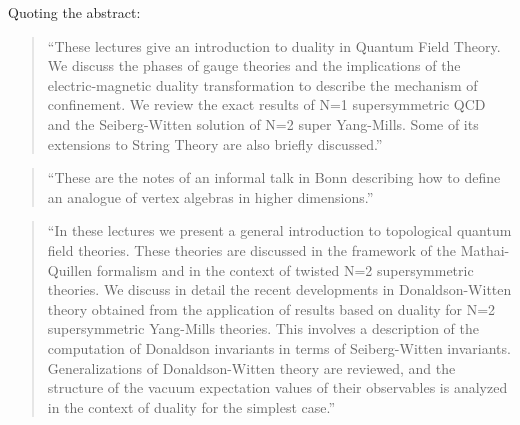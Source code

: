 \documentclass{article}
\def\tightlist{}
\renewcommand{\texttt}[1]{%
  \begingroup
  \ttfamily
  \begingroup\lccode`~=`/\lowercase{\endgroup\def~}{/\discretionary{}{}{}}%
  \begingroup\lccode`~=`[\lowercase{\endgroup\def~}{[\discretionary{}{}{}}%
  \begingroup\lccode`~=`.\lowercase{\endgroup\def~}{.\discretionary{}{}{}}%
  \catcode`/=\active\catcode`[=\active\catcode`.=\active
  \scantokens{#1\noexpand}%
  \endgroup
}
\begin{document}
Quoting the abstract:

\begin{quote}
``These lectures give an introduction to duality in Quantum Field
Theory. We discuss the phases of gauge theories and the implications of
the electric-magnetic duality transformation to describe the mechanism
of confinement. We review the exact results of N=1 supersymmetric QCD
and the Seiberg-Witten solution of N=2 super Yang-Mills. Some of its
extensions to String Theory are also briefly discussed.''
\end{quote}


\begin{quote}
``These are the notes of an informal talk in Bonn describing how to
define an analogue of vertex algebras in higher dimensions.''
\end{quote}


\begin{quote}
``In these lectures we present a general introduction to topological
quantum field theories. These theories are discussed in the framework of
the Mathai-Quillen formalism and in the context of twisted N=2
supersymmetric theories. We discuss in detail the recent developments in
Donaldson-Witten theory obtained from the application of results based
on duality for N=2 supersymmetric Yang-Mills theories. This involves a
description of the computation of Donaldson invariants in terms of
Seiberg-Witten invariants. Generalizations of Donaldson-Witten theory
are reviewed, and the structure of the vacuum expectation values of
their observables is analyzed in the context of duality for the simplest
case.''
\end{quote}
\end{document}
